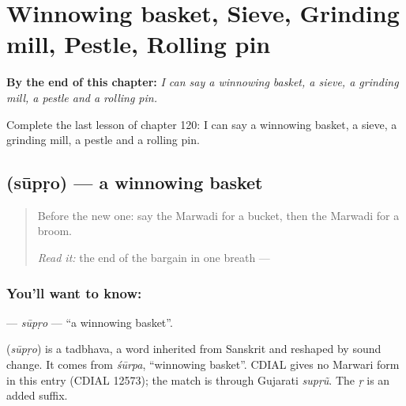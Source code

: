 
\chapter{Winnowing basket, Sieve, Grinding mill, Pestle, Rolling pin}
\label{ch:mw-winnowing-basket-sieve-grinding-mill-pestle-rolling-pin}

\begin{chapteropening}
\textbf{By the end of this chapter:} \emph{I can say a winnowing basket, a sieve, a grinding mill, a pestle and a rolling pin.}

Complete the last lesson of chapter 120: I can say a winnowing basket, a sieve, a grinding mill, a pestle and a rolling pin.
\end{chapteropening}

\section[\texorpdfstring{\mw{सूपड़ो} (sūpṛo)}{सूपड़ो (sūpṛo)}]{ (sūpṛo) — a winnowing basket}

\label{lesson:MW-C120-supro}



\begin{quote}
Before the new one: say the Marwadi for a bucket, then the Marwadi for a broom.

\emph{Read it:} the end of the bargain in one breath — \textbf{     }
\end{quote}

\subsection*{You'll want to know: }
\textbf{} — \emph{sūpṛo} — \textquotedblleft{}a winnowing basket\textquotedblright{}.

\begin{cousinweb}
\textbf{} (\emph{sūpṛo}) is a tadbhava, a word inherited from Sanskrit and reshaped by sound change. It comes from \emph{śūrpa}, \textquotedblleft{}winnowing basket\textquotedblright{}. CDIAL gives no Marwari form in this entry (CDIAL 12573); the match is through Gujarati \emph{supṛũ}. The \emph{ṛ} is an added suffix.
\end{cousinweb}

